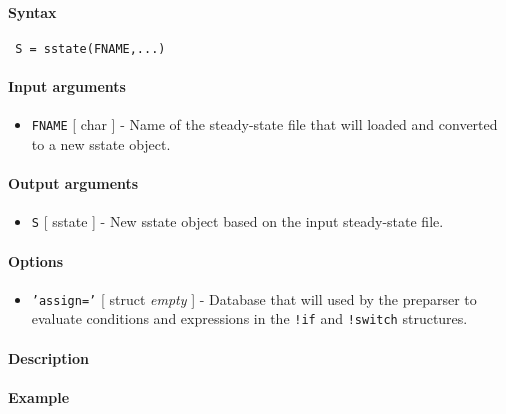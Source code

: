 


	\paragraph{Syntax}
 
 \begin{verbatim}
 S = sstate(FNAME,...)
 \end{verbatim}
 
 \paragraph{Input arguments}
 
 \begin{itemize}
 \item
   \texttt{FNAME} {[} char {]} - Name of the steady-state file that will
   loaded and converted to a new sstate object.
 \end{itemize}
 
 \paragraph{Output arguments}
 
 \begin{itemize}
 \item
   \texttt{S} {[} sstate {]} - New sstate object based on the input
   steady-state file.
 \end{itemize}
 
 \paragraph{Options}
 
 \begin{itemize}
 \item
   \texttt{'assign='} {[} struct \textbar{} \emph{empty} {]} - Database
   that will used by the preparser to evaluate conditions and expressions
   in the \texttt{!if} and \texttt{!switch} structures.
 \end{itemize}
 
 \paragraph{Description}
 
 \paragraph{Example}


